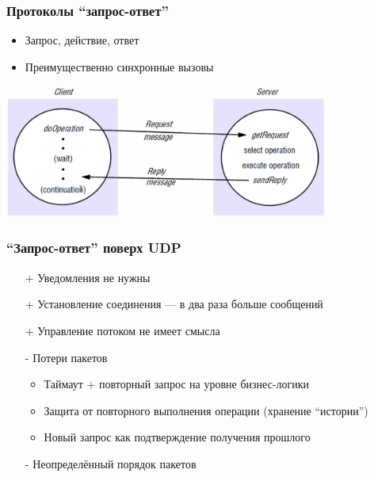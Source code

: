 \documentclass[xetex,mathserif,serif]{beamer}
\begin{document}
    \begin{frame}
        \frametitle{Протоколы ``запрос-ответ''}
        \begin{itemize}
            \item Запрос, действие, ответ
            \item Преимущественно синхронные вызовы
        \end{itemize}
        \begin{center}
            \includegraphics[width=0.8\textwidth]{requestReplyProtocols.png}
        \end{center}
    \end{frame}

    \begin{frame}
        \frametitle{``Запрос-ответ'' поверх UDP}
        \begin{itemize}
            \item[+] Уведомления не нужны
            \item[+] Установление соединения --- в два раза больше сообщений
            \item[+] Управление потоком не имеет смысла
            \item[-] Потери пакетов
            \begin{itemize}
                \item Таймаут + повторный запрос на уровне бизнес-логики
                \item Защита от повторного выполнения операции (хранение ``истории'')
                \item Новый запрос как подтверждение получения прошлого
            \end{itemize}
            \item[-] Неопределённый порядок пакетов
        \end{itemize}
    \end{frame}
\end{document}
